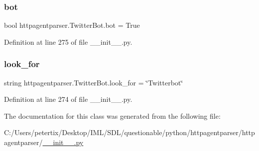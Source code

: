 \subsubsection{\texorpdfstring{bot}{bot}}
{\footnotesize\ttfamily bool httpagentparser.\+Twitter\+Bot.\+bot = True\hspace{0.3cm}{\ttfamily [static]}}



Definition at line 275 of file \+\_\+\+\_\+init\+\_\+\+\_\+.\+py.

\hypertarget{classhttpagentparser_1_1_twitter_bot_a16632e63bd940ef71deb0563fdfcd41e}{}\label{classhttpagentparser_1_1_twitter_bot_a16632e63bd940ef71deb0563fdfcd41e} 
\subsubsection{\texorpdfstring{look\+\_\+for}{look\_for}}
{\footnotesize\ttfamily string httpagentparser.\+Twitter\+Bot.\+look\+\_\+for = \char`\"{}Twitterbot\char`\"{}\hspace{0.3cm}{\ttfamily [static]}}



Definition at line 274 of file \+\_\+\+\_\+init\+\_\+\+\_\+.\+py.



The documentation for this class was generated from the following file\+:\begin{DoxyCompactItemize}
\item 
C\+:/\+Users/petertix/\+Desktop/\+I\+M\+L/\+S\+D\+L/questionable/python/httpagentparser/httpagentparser/\hyperlink{____init_____8py}{\+\_\+\+\_\+init\+\_\+\+\_\+.\+py}\end{DoxyCompactItemize}
